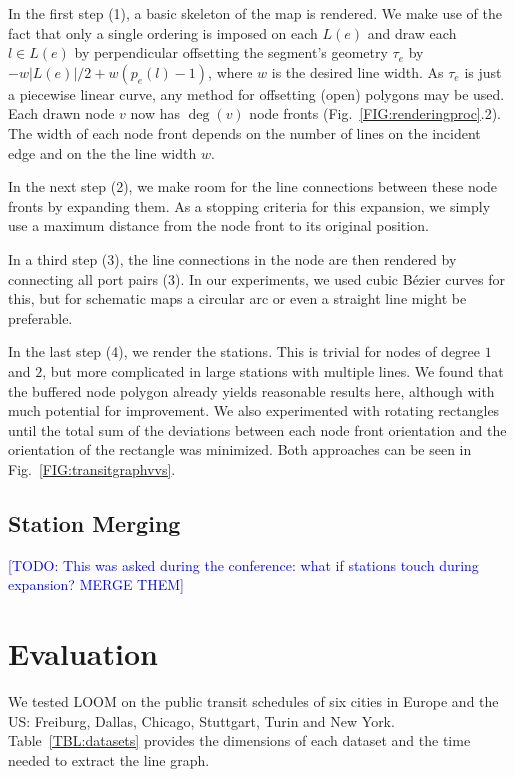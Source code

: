 \documentclass[format=acmsmall, review=false, screen=true]{acmart}
\newcommand\TODO[1]{\textcolor{blue}{\small [TODO: #1]}}
\begin{document}
In the first step (1), a basic skeleton of the map is rendered. We make use of the fact that only a single ordering is imposed on each $L(e)$ and draw each $l \in L(e)$ by perpendicular offsetting the segment's geometry $\tau_{e}$ by $-w\left|L(e)\right|/2 + w\left(p_{e}(l)-1\right)$, where $w$ is the desired line width. As $\tau_{e}$ is just a piecewise linear curve, any method for offsetting (open) polygons may be used. Each drawn node $v$ now has $\deg(v)$ node fronts (Fig.~\ref{FIG:renderingproc}.2). The width of each node front depends on the number of lines on the incident edge and on the the line width $w$. 

In the next step (2), we make room for the line connections between these node fronts by expanding them. As a stopping criteria for this expansion, we simply use a maximum distance from the node front to its original position. 

In a third step (3), the line connections in the node are then rendered by connecting all port pairs (3). In our experiments, we used cubic B\'ezier curves for this, but for schematic maps a circular arc or even a straight line might be preferable.

In the last step (4), we render the stations. This is trivial for nodes of degree $1$ and $2$, but more complicated in large stations with multiple lines. We found that the buffered node polygon already yields reasonable results here, although with much potential for improvement. We also experimented with rotating rectangles until the total sum of the deviations between each node front orientation and the orientation of the rectangle was minimized. Both approaches can be seen in Fig.~\ref{FIG:transitgraphvvs}.

\subsection{Station Merging}

\TODO{This was asked during the conference: what if stations touch during expansion? MERGE THEM}

\section{Evaluation}\label{SEC:eval}
%
\def\degv{\text{deg}(v)}
\def\Hms{\makebox[1.6mm][l]{\hspace{0.2mm}\footnotesize ms}}
\def\Hs{\makebox[1.6mm][l]{\hspace{0.2mm}\footnotesize s}}
\def\Hk{\makebox[1.6mm][l]{\hspace{0.2mm}\footnotesize k}}
\def\Hm{\makebox[1.6mm][l]{\hspace{0.2mm}\footnotesize m}}
\def\Hh{\makebox[1.6mm][l]{\hspace{0.2mm}\footnotesize h}}
\def\Hhline{\\[.7mm]\hline}
We tested LOOM on the public transit schedules of six cities in Europe and the US: Freiburg, Dallas, Chicago, Stuttgart, Turin and New York.
Table~\ref{TBL:datasets} provides the dimensions of each dataset and the time needed to extract the line graph.
\end{document}
